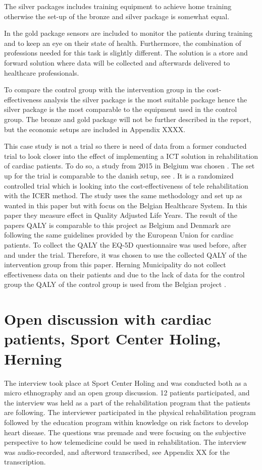 The silver packages includes training equipment to achieve home training otherwise the set-up of the bronze and silver package is somewhat equal. 

In the gold package sensors are included to monitor the patients during training and to keep an eye on their state of health. Furthermore, the combination of professions needed for this task is slightly different. The solution is a store and forward solution where data will be collected and afterwards delivered to healthcare professionals.  

To compare the control group with the intervention group in the cost-effectiveness analysis the silver package is the most suitable package hence the silver package is the most comparable to the equipment used in the control group. The bronze and gold package will not be further described in the report, but the economic setups are included in Appendix XXXX.

This case study is not a trial so there is need of data from a former conducted trial to look closer into the effect of implementing a ICT solution in rehabilitation of cardiac patients. To do so, a study from 2015 in Belgium was chosen \cite{costeffect}. The set up for the trial is comparable to the danish setup, see . It is a randomized controlled trial which is looking into the cost-effectiveness of tele rehabilitation with the ICER method. The study uses the same methodology and set up as wanted in this paper but with focus on the Belgian Healthcare System. In this paper they measure effect in Quality Adjusted Life Years. The result of the papers QALY is comparable to this project as Belgium and Denmark are following the same guidelines provided by the European Union for cardiac patients. To collect the QALY the EQ-5D questionnaire was used before, after and under the trial. Therefore, it was chosen to use the collected QALY of the intervention group from this paper. Herning Municipality do not collect effectiveness data on their patients and due to the lack of data for the control group the QALY of the control group is used from the Belgian project \cite{costeffect}.

\section{Open discussion with cardiac patients, Sport Center Holing, Herning}
\label{patientinterview} 

The interview took place at Sport Center Holing and was conducted both as a micro ethnography and an open group discussion. 12 patients participated, and the interview was held as a part of the rehabilitation program that the patients are following.  The interviewer participated in the physical rehabilitation program followed by the education program within knowledge on risk factors to develop heart disease. The questions was premade and were focusing on the subjective perspective to how telemedicine could be used in rehabilitation. The interview was audio-recorded, and afterword transcribed, see Appendix XX for the transcription. 


